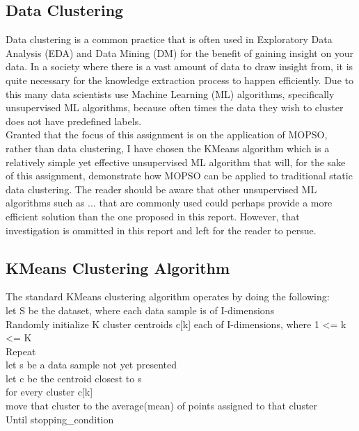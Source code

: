 \begin{flushleft}
    \subsection{Data Clustering}
        Data clustering is a common practice that is often used in 
        Exploratory Data Analysis (EDA) and Data Mining (DM) for the 
        benefit of gaining insight on your data. In a society where there 
        is a vast amount of data to draw insight from, it is quite necessary 
        for the knowledge extraction process to happen efficiently. Due to this 
        many data scientists use Machine Learning (ML) algorithms, specifically 
        unsupervised ML algorithms, because often times the data they wish to cluster 
        does not have predefined labels.
        \\
        Granted that the focus of this assignment is on the application of MOPSO, rather 
        than data clustering, I have chosen the KMeans algorithm which is a relatively simple 
        yet effective unsupervised ML algorithm that will, for the sake of this assignment, 
        demonstrate how MOPSO can be applied to traditional static data clustering. The reader 
        should be aware that other unsupervised ML algorithms such as ...  that are commonly used
        could perhaps provide a more efficient solution than the one proposed in this report. However, 
        that investigation is ommitted in this report and left for the reader to persue.

    \subsection{KMeans Clustering Algorithm}
        The standard KMeans clustering algorithm operates by doing the following: \\
        let S be the dataset, where each data sample is of I-dimensions \\
        Randomly initialize K cluster centroids c[k] each of I-dimensions, where 1 <= k <= K \\
        Repeat \\
            let s be a data sample not yet presented \\
            let c be the centroid closest to s \\
            for every cluster c[k] \\
                move that cluster to the average(mean) of points assigned to that cluster \\
        Until stopping_condition \\


\end{flushleft}

